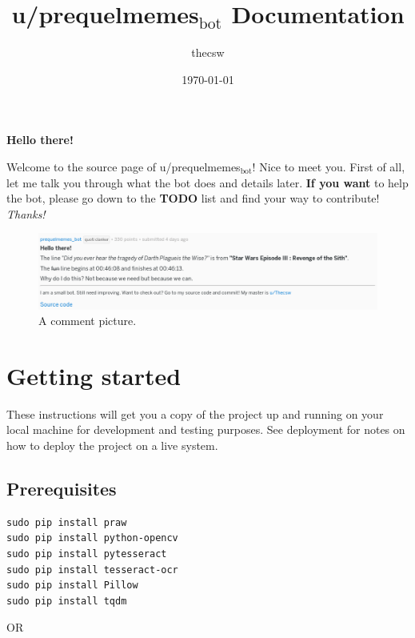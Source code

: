 \documentclass[11pt]{article}
\author{thecsw}
\date{\today}
\title{u/prequelmemes$_{\text{bot}}$ Documentation}
\begin{document}
\maketitle
\tableofcontents

\newpage
\textbf{Hello there!}

Welcome to the source page of u/prequelmemes$_{\text{bot}}$! Nice to meet you. First of
all, let me talk you through what the bot does and details later. \textbf{If you want}
to help the bot, please go down to the \textbf{TODO} list and find your way to
contribute! \emph{Thanks!}

\begin{figure}[htb]
\centering
\includegraphics[width=.9\linewidth]{./doc/pic.png}
\caption{\label{preq_pic}A comment picture.}
\end{figure}

\section{Getting started}
\label{sec-1}

These instructions will get you a copy of the project up and running on your
local machine for development and testing purposes. See deployment for notes on
how to deploy the project on a live system. 

\subsection{Prerequisites}
\label{sec-1-1}

\begin{verbatim}
sudo pip install praw
sudo pip install python-opencv
sudo pip install pytesseract
sudo pip install tesseract-ocr
sudo pip install Pillow
sudo pip install tqdm
\end{verbatim}

OR
\end{document}
